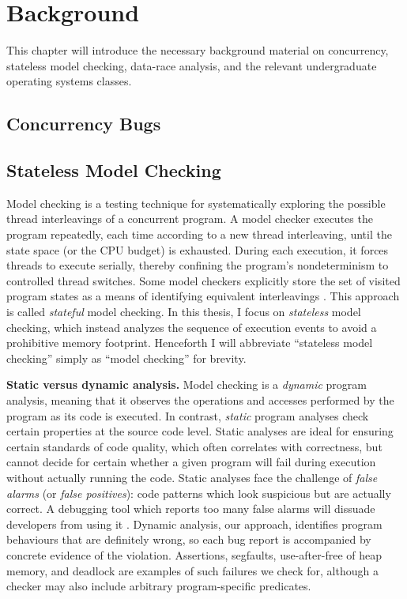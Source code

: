 \chapter{Background}
\label{chap:background}

This chapter will introduce the necessary background material on concurrency, stateless model checking, data-race analysis, and the relevant undergraduate operating systems classes.

\section{Concurrency Bugs}


\section{Stateless Model Checking}

Model checking \cite{verisoft} is a testing technique for systematically exploring the possible thread interleavings of a concurrent program.
A model checker executes the program repeatedly, each time according to a new thread interleaving, until the state space (or the CPU budget) is exhausted.
During each execution, it forces threads to execute serially, thereby confining the program's nondeterminism to controlled thread switches.
Some model checkers explicitly store the set of visited program states as a means of identifying equivalent interleavings \cite{spin}.
This approach is called {\em stateful} model checking.
In this thesis, I focus on {\em stateless} model checking,
which instead analyzes the sequence of execution events to avoid a prohibitive memory footprint.
Henceforth I will abbreviate ``stateless model checking'' simply as ``model checking'' for brevity.

{\bf Static versus dynamic analysis.}
Model checking is a {\em dynamic} program analysis, meaning that it observes the operations and accesses performed by the program as its code is executed.
In contrast, {\em static} program analyses check certain properties at the source code level.
Static analyses are ideal for ensuring certain standards of code quality, which often correlates with correctness,
but cannot decide for certain whether a given program will fail during execution without actually running the code.
Static analyses face the challenge of {\em false alarms} (or {\em false positives}):
code patterns which look suspicious but are actually correct.
A debugging tool which reports too many false alarms will dissuade developers from using it \cite{racerx}.
Dynamic analysis, our approach, identifies program behaviours that are definitely wrong,
so each bug report is accompanied by concrete evidence of the violation.
Assertions, segfaults, use-after-free of heap memory, and deadlock are examples of such failures we check for,
although a checker may also include arbitrary program-specific predicates.

